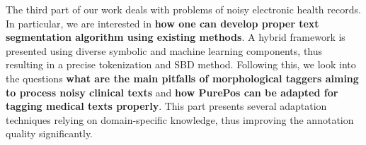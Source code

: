 The third part of our work deals with problems of noisy electronic health records.
In particular, we  are interested in \textbf{how one can develop proper text segmentation algorithm using existing methods}. 
A hybrid framework is presented using diverse symbolic and machine learning components, thus resulting in a precise tokenization and SBD method.
Following this, we look into the questions \textbf{what are the main pitfalls of morphological taggers aiming to process noisy clinical texts} and \textbf{how PurePos can be adapted for tagging medical texts properly}.
This part presents several adaptation techniques relying on domain-specific knowledge, thus improving the annotation quality significantly.

